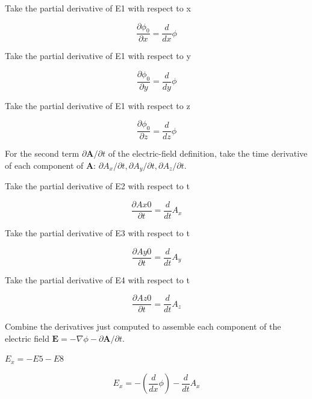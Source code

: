 \documentclass[dvipdfmx]{article}
\begin{document}
Take the partial derivative of E1 with respect to x

\begin{equation}
  \frac{\partial \phi_{0}}{\partial x} = \frac{d}{d x} \phi
  \label{eq:E5}
\end{equation}

Take the partial derivative of E1 with respect to y

\begin{equation}
  \frac{\partial \phi_{0}}{\partial y} = \frac{d}{d y} \phi
  \label{eq:E6}
\end{equation}

Take the partial derivative of E1 with respect to z

\begin{equation}
  \frac{\partial \phi_{0}}{\partial z} = \frac{d}{d z} \phi
  \label{eq:E7}
\end{equation}

For the second term $\partial\mathbf A/\partial t$ of the electric-field definition, take the time derivative of each component of $\mathbf A$: $\partial A_x/\partial t,\partial A_y/\partial t,\partial A_z/\partial t$.

Take the partial derivative of E2 with respect to t

\begin{equation}
  \frac{\partial Ax0}{\partial t} = \frac{d}{d t} A_{x}
  \label{eq:E8}
\end{equation}

Take the partial derivative of E3 with respect to t

\begin{equation}
  \frac{\partial Ay0}{\partial t} = \frac{d}{d t} A_{y}
  \label{eq:E9}
\end{equation}

Take the partial derivative of E4 with respect to t

\begin{equation}
  \frac{\partial Az0}{\partial t} = \frac{d}{d t} A_{z}
  \label{eq:E10}
\end{equation}

Combine the derivatives just computed to assemble each component of the electric field $\mathbf E=-\nabla\phi-\partial\mathbf A/\partial t$.

$E_x = -E5 - E8$

\begin{equation}
  E_x = -\left(\frac{d}{d x} \phi\right)-\frac{d}{d t} A_{x}
  \label{eq:E11}
\end{equation}
\end{document}

